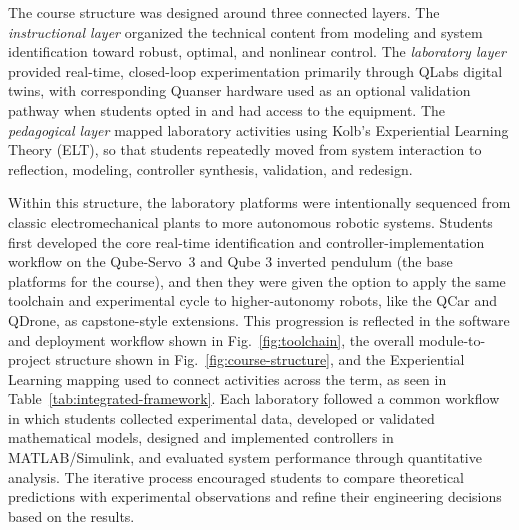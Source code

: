 \documentclass[journal]{IEEEtran}
\begin{document}
The course structure was designed around three connected layers. The \textit{instructional layer} organized the technical content from modeling and system identification toward robust, optimal, and nonlinear control. The \textit{laboratory layer} provided real-time, closed-loop experimentation primarily through QLabs digital twins, with corresponding Quanser hardware used as an optional validation pathway when students opted in and had access to the equipment. The \textit{pedagogical layer} mapped laboratory activities using Kolb's Experiential Learning Theory (ELT), so that students repeatedly moved from system interaction to reflection, modeling, controller synthesis, validation, and redesign.

Within this structure, the laboratory platforms were intentionally sequenced from classic electromechanical plants to more autonomous robotic systems. Students first developed the core real-time identification and controller-implementation workflow on the Qube-Servo~3 and Qube 3 inverted pendulum (the base platforms for the course), and then they were given the option to apply the same toolchain and experimental cycle to higher-autonomy robots, like the QCar and QDrone, as capstone-style extensions. This progression is reflected in the software and deployment workflow shown in Fig.~\ref{fig:toolchain}, the overall module-to-project structure shown in Fig.~\ref{fig:course-structure}, and the Experiential Learning mapping used to connect activities across the term, as seen in Table~\ref{tab:integrated-framework}. Each laboratory followed a common workflow in which students collected experimental data, developed or validated mathematical models, designed and implemented controllers in MATLAB/Simulink, and evaluated system performance through quantitative analysis. The iterative process encouraged students to compare theoretical predictions with experimental observations and refine their engineering decisions based on the results.

\end{document}
